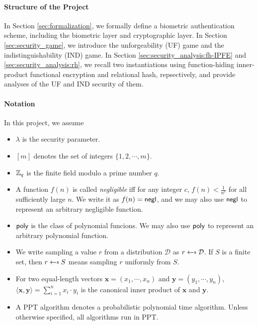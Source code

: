 \paragraph{Structure of the Project}
In Section \ref{sec:formalization}, we formally define a biometric authentication scheme, including the biometric layer and cryptographic layer. 
In Section \ref{sec:security_game}, we introduce the unforgeability (UF) game and the indistinguishability (IND) game. 
In Section \ref{sec:security_analysis:fh-IPFE} and \ref{sec:security_analysis:rh}, we recall two instantiations using function-hiding inner-product functional encryption and relational hash, repsectively, and provide analyses of the UF and IND security of them.

\paragraph{Notation}
In this project, we assume

\begin{itemize}
	
	\item $\lambda$ is the security parameter.

	\item $[m]$ denotes the set of integers $\{1, 2, \cdots, m\}$.

	\item $\mathbb{Z}_q$ is the finite field modulo a prime number $q$.

	\item A function $f(n)$ is called \emph{negligible} iff for any integer $c$, $f(n) < \frac{1}{n^c}$ for all sufficiently large $n$. We write it as $f(n) = \mathsf{negl}$, and we may also use $\mathsf{negl}$ to represent an arbitrary negligible function.
	
	\item $\mathsf{poly}$ is the class of polynomial funcions. We may also use $\mathsf{poly}$ to represent an arbitrary polynomial function.
	
	\item We write sampling a value $r$ from a distribution $\mathcal{D}$ as $r \getsdollar \mathcal{D}$. If $S$ is a finite set, then $r \getsdollar S$ means sampling $r$ uniformly from $S$.

	\item For two equal-length vectors $\mathbf{x} = (x_1, \cdots, x_n)$ and $\mathbf{y} = (y_1, \cdots, y_n)$, $\langle \mathbf{x}, \mathbf{y} \rangle = \sum_{i=1}^n x_i \cdot y_i$ is the canonical inner product of $\mathbf{x}$ and $\mathbf{y}$. 

	\item A PPT algorithm denotes a probabilistic polynomial time algorithm. Unless otherwise specified, all algorithms run in PPT.

\end{itemize}


